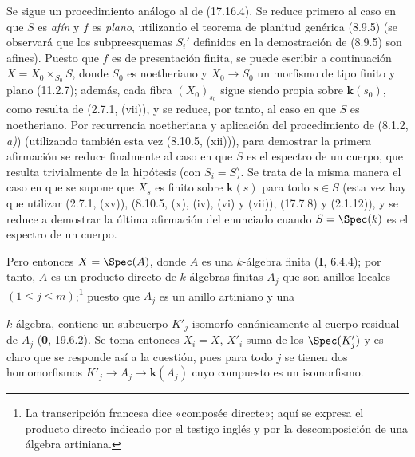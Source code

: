 Se sigue un procedimiento análogo al de (17.16.4). Se reduce primero al caso en que $S$ es \emph{afín} y $f$ es \emph{plano}, utilizando el teorema de planitud genérica (8.9.5) (se observará que los subpreesquemas $S_i'$ definidos en la demostración de (8.9.5) son afines). Puesto que $f$ es de presentación finita, se puede escribir a continuación $X=X_0\times_{S_0}S$, donde $S_0$ es noetheriano y $X_0\to S_0$ un morfismo de tipo finito y plano (11.2.7); además, cada fibra $(X_0)_{s_0}$ sigue siendo propia sobre $\boldsymbol{k}(s_0)$, como resulta de (2.7.1, (vii)), y se reduce, por tanto, al caso en que $S$ es noetheriano. Por recurrencia noetheriana y aplicación del procedimiento de (8.1.2, \emph{a)}) (utilizando también esta vez (8.10.5, (xii))), para demostrar la primera afirmación se reduce finalmente al caso en que $S$ es el espectro de un cuerpo, que resulta trivialmente de la hipótesis (con $S_i=S$). Se trata de la misma manera el caso en que se supone que $X_s$ es finito sobre $\boldsymbol{k}(s)$ para todo $s\in S$ (esta vez hay que utilizar (2.7.1, (xv)), (8.10.5, (x), (iv), (vi) y (vii)), (17.7.8) y (2.1.12)), y se reduce a demostrar la última afirmación del enunciado cuando $S=\Spec(k)$ es el espectro de un cuerpo.

Pero entonces $X=\Spec(A)$, donde $A$ es una $k$-álgebra finita (\textbf I, 6.4.4); por tanto, $A$ es un producto directo de $k$-álgebras finitas $A_j$ que son anillos locales $(1\leq j\leq m)$;\footnote{La transcripción francesa dice «composée directe»; aquí se expresa el producto directo indicado por el testigo inglés y por la descomposición de una álgebra artiniana.} puesto que $A_j$ es un anillo artiniano y una


$k$-álgebra, contiene un subcuerpo $K'_j$ isomorfo canónicamente al cuerpo residual de $A_j$ (\textbf 0, 19.6.2). Se toma entonces $X_i=X$, $X'_i$ suma de los $\Spec(K'_j)$ y es claro que se responde así a la cuestión, pues para todo $j$ se tienen dos homomorfismos $K'_j\to A_j\to\boldsymbol{k}(A_j)$ cuyo compuesto es un isomorfismo.
